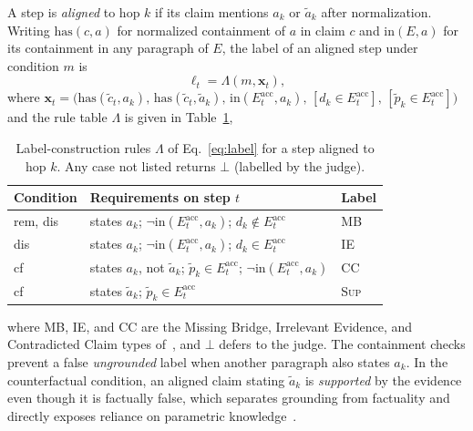 \documentclass[conference]{IEEEtran}
\newcommand{\Eacc}{E^{\mathrm{acc}}}
\newcommand{\ctil}{\tilde{c}}
\begin{document}
A step is \emph{aligned} to hop $k$ if its claim mentions $a_k$ or $\tilde{a}_k$ after normalization. Writing $\mathrm{has}(c,a)$ for normalized containment of $a$ in claim $c$ and $\mathrm{in}(E,a)$ for its containment in any paragraph of $E$, the label of an aligned step under condition $m$ is
\begin{equation}\label{eq:label}
\ell_t=\Lambda(m,\mathbf{x}_t),
\end{equation}
where $\mathbf{x}_t=\big(\mathrm{has}(\ctil_t,a_k),\,\mathrm{has}(\ctil_t,\tilde{a}_k),\,\mathrm{in}(\Eacc_t,a_k),\,[d_k\!\in\!\Eacc_t],\,[\tilde{p}_k\!\in\!\Eacc_t]\big)$ and the rule table $\Lambda$ is given in Table~\ref{tab:rules},

\begin{table}[t]
\caption{Label-construction rules $\Lambda$ of Eq.~\eqref{eq:label} for a step aligned to hop $k$. Any case not listed returns $\bot$ (labelled by the judge).}\label{tab:rules}
\centering\footnotesize
\begin{tabular}{@{}lp{}l@{}}
\toprule
Condition & Requirements on step $t$ & Label \\
\midrule
rem, dis & states $a_k$; $\neg\mathrm{in}(\Eacc_t,a_k)$; $d_k\notin\Eacc_t$ & \textsc{MB} \\
dis & states $a_k$; $\neg\mathrm{in}(\Eacc_t,a_k)$; $d_k\in\Eacc_t$ & \textsc{IE} \\
cf & states $a_k$, not $\tilde{a}_k$; $\tilde{p}_k\in\Eacc_t$; $\neg\mathrm{in}(\Eacc_t,a_k)$ & \textsc{CC} \\
cf & states $\tilde{a}_k$; $\tilde{p}_k\in\Eacc_t$ & \textsc{Sup} \\
\bottomrule
\end{tabular}
\end{table}
\noindent where \textsc{MB}, \textsc{IE}, and \textsc{CC} are the Missing Bridge, Irrelevant Evidence, and Contradicted Claim types of~\cite{ji2026stepgap}, and $\bot$ defers to the judge. The containment checks prevent a false \emph{ungrounded} label when another paragraph also states $a_k$. In the counterfactual condition, an aligned claim stating $\tilde{a}_k$ is \emph{supported} by the evidence even though it is factually false, which separates grounding from factuality and directly exposes reliance on parametric knowledge~\cite{longpre2021entity,sainz2023contamination}.
\end{document}
